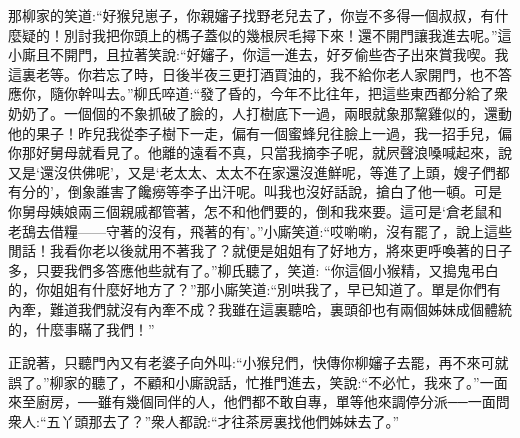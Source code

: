 

\begin{parag}
    那柳家的笑道:“好猴兒崽子，你親嬸子找野老兒去了，你豈不多得一個叔叔，有什麼疑的！別討我把你頭上的榪子蓋似的幾根屄毛撏下來！還不開門讓我進去呢。”這小廝且不開門，且拉著笑說:“好嬸子，你這一進去，好歹偷些杏子出來賞我喫。我這裏老等。你若忘了時，日後半夜三更打酒買油的，我不給你老人家開門，也不答應你，隨你幹叫去。”柳氏啐道:“發了昏的，今年不比往年，把這些東西都分給了衆奶奶了。一個個的不象抓破了臉的，人打樹底下一過，兩眼就象那黧雞似的，還動他的果子！昨兒我從李子樹下一走，偏有一個蜜蜂兒往臉上一過，我一招手兒，偏你那好舅母就看見了。他離的遠看不真，只當我摘李子呢，就屄聲浪嗓喊起來，說又是‘還沒供佛呢’，又是‘老太太、太太不在家還沒進鮮呢，等進了上頭，嫂子們都有分的’，倒象誰害了饞癆等李子出汗呢。叫我也沒好話說，搶白了他一頓。可是你舅母姨娘兩三個親戚都管著，怎不和他們要的，倒和我來要。這可是‘倉老鼠和老鴰去借糧——守著的沒有，飛著的有’。”小廝笑道:“哎喲喲，沒有罷了，說上這些閒話！我看你老以後就用不著我了？就便是姐姐有了好地方，將來更呼喚著的日子多，只要我們多答應他些就有了。”柳氏聽了，笑道: “你這個小猴精，又搗鬼弔白的，你姐姐有什麼好地方了？”那小廝笑道:“別哄我了，早已知道了。單是你們有內牽，難道我們就沒有內牽不成？我雖在這裏聽哈，裏頭卻也有兩個姊妹成個體統的，什麼事瞞了我們！”
\end{parag}


\begin{parag}
    正說著，只聽門內又有老婆子向外叫:“小猴兒們，快傳你柳嬸子去罷，再不來可就誤了。”柳家的聽了，不顧和小廝說話，忙推門進去，笑說:“不必忙，我來了。”一面來至廚房，──雖有幾個同伴的人，他們都不敢自專，單等他來調停分派──一面問衆人:“五丫頭那去了？”衆人都說:“才往茶房裏找他們姊妹去了。”
\end{parag}


